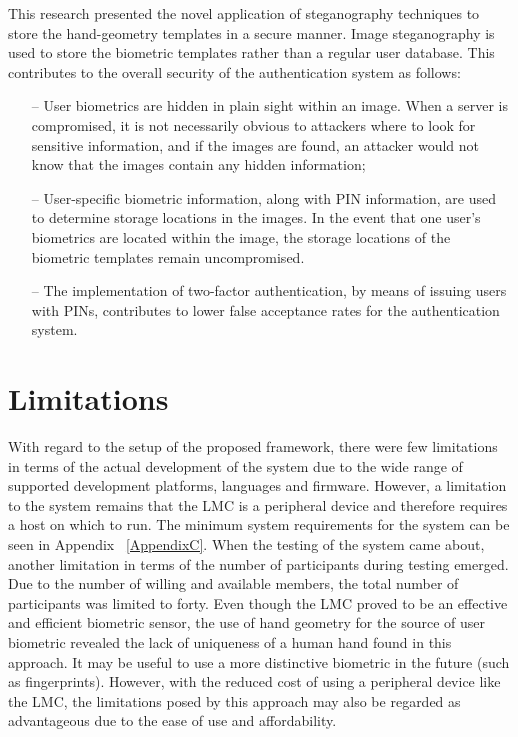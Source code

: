 This research presented the novel application of steganography techniques to store the hand-geometry templates in a secure manner. Image steganography is used to store the biometric templates rather than a regular user database. This contributes to the overall security of the authentication system as follows:
\begin{itemize}
    \item[--] User biometrics are hidden in plain sight within an image. When a server is compromised, it is not necessarily obvious to attackers where to look for sensitive information, and if the images are found, an attacker would not know that the images contain any hidden information;
    \item[--] User-specific biometric information, along with PIN information, are used to determine storage locations in the images. In the event that one user's biometrics are located within the image, the storage locations of the biometric templates remain uncompromised.
    \item[--] The implementation of two-factor authentication, by means of issuing users with PINs, contributes to lower false acceptance rates for the authentication system.
\end{itemize}

\section{Limitations}

With regard to the setup of the proposed framework, there were few limitations in terms of the actual development of the system due to the wide range of supported development platforms, languages and firmware. However, a limitation to the system remains that the LMC is a peripheral device and therefore requires a host on which to run. The minimum system requirements for the system can be seen in Appendix ~\ref{AppendixC}.
When the testing of the system came about, another limitation in terms of the number of participants during testing emerged. Due to the number of willing and available members, the total number of participants was limited to forty. 
Even though the LMC proved to be an effective and efficient biometric sensor, the use of hand geometry for the source of user biometric revealed the lack of uniqueness of a human hand found in this approach. It may be useful to use a more distinctive biometric in the future (such as fingerprints). However, with the reduced cost of using a peripheral device like the LMC, the limitations posed by this approach may also be regarded as advantageous due to the ease of use and affordability.

